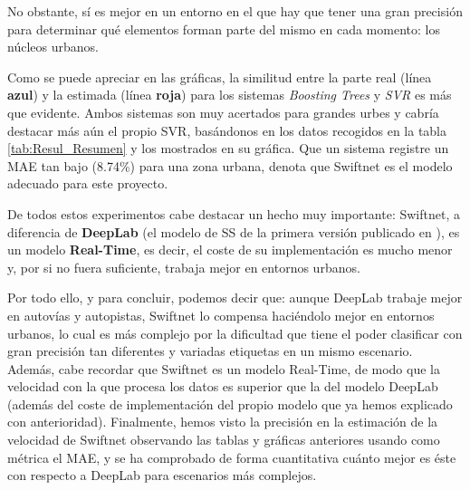 No obstante, sí es mejor en un entorno en el que hay que tener una gran precisión para determinar qué elementos forman parte del mismo en cada momento: los núcleos urbanos.

Como se puede apreciar en las gráficas, la similitud entre la parte real (línea \textbf{azul}) y la estimada (línea \textbf{roja}) para los sistemas \textit{Boosting Trees} y \textit{\ac{SVR}} es más que evidente. Ambos sistemas son muy acertados para grandes urbes y cabría destacar más aún el propio \ac{SVR}, basándonos en los datos recogidos en la tabla \ref{tab:Resul_Resumen} y los mostrados en su gráfica. Que un sistema registre un \ac{MAE} tan bajo (8.74\%) para una zona urbana, denota que Swiftnet es el modelo adecuado para este proyecto.


De todos estos experimentos cabe destacar un hecho muy importante: Swiftnet, a diferencia de \textbf{DeepLab} (el modelo de \ac{SS} de la primera versión publicado en \cite{isa2}), es un modelo \textbf{Real-Time}, es decir, el coste de su implementación es mucho menor y, por si no fuera suficiente, trabaja mejor en entornos urbanos.

Por todo ello, y para concluir, podemos decir que: aunque DeepLab trabaje mejor en autovías y autopistas, Swiftnet lo compensa haciéndolo mejor en entornos urbanos, lo cual es más complejo por la dificultad que tiene el poder clasificar con gran precisión tan diferentes y variadas etiquetas en un mismo escenario. Además, cabe recordar que Swiftnet es un modelo Real-Time, de modo que la velocidad con la que procesa los datos es superior que la del modelo DeepLab (además del coste de implementación del propio modelo que ya hemos explicado con anterioridad). Finalmente, hemos visto la precisión en la estimación de la velocidad de Swiftnet observando las tablas y gráficas anteriores usando como métrica el \ac{MAE}, y se ha comprobado de forma cuantitativa cuánto mejor es éste con respecto a DeepLab para escenarios más complejos.
